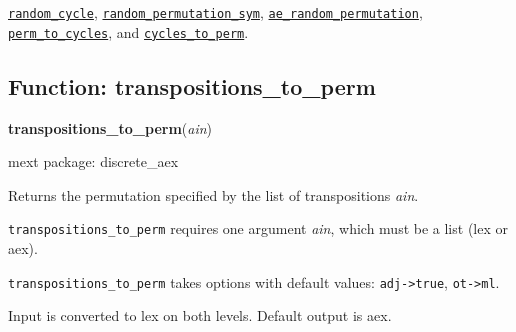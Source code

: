 \documentclass[]{article}
\begin{document}
\vspace{5 pt}


  \hyperlink{random_cycle}{{\tt random\_cycle}}, \hyperlink{random_permutation_sym}{{\tt random\_permutation\_sym}}, \hyperlink{ae_random_permutation}{{\tt ae\_random\_permutation}}, \hyperlink{perm_to_cycles}{{\tt perm\_to\_cycles}}, and \hyperlink{cycles_to_perm}{{\tt cycles\_to\_perm}}.

\vspace{5 pt}


\subsection{Function: transpositions\_to\_perm\label{sec:transpositions_to_perm}}
\hypertarget{transpositions_to_perm}{}
{\bf transpositions\_to\_perm}({\it ain})


\noindent mext package: discrete\_aex



\vspace{5 pt}
Returns the permutation specified by the list of transpositions {\it ain}. 

\vspace{5 pt}

   {\tt transpositions\_to\_perm} requires one argument {\it ain}, which must be a list (lex or aex).


\vspace{5 pt}

{\tt transpositions\_to\_perm} takes options with default values: {\tt adj->true}, {\tt ot->ml}.
\vspace{5 pt}


Input is converted to lex on both levels. Default output is aex. 

\vspace{5 pt}
\end{document}

